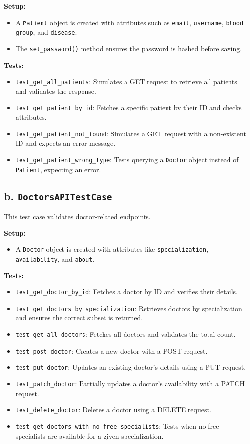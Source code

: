 \documentclass[12pt]{article}
\begin{document}
\textbf{Setup:}
\begin{itemize}
    \item A \texttt{Patient} object is created with attributes such as \texttt{email}, \texttt{username}, \texttt{blood group}, and \texttt{disease}.
    \item The \texttt{set\_password()} method ensures the password is hashed before saving.
\end{itemize}

\textbf{Tests:}
\begin{itemize}
    \item \texttt{test\_get\_all\_patients}: Simulates a GET request to retrieve all patients and validates the response.
    \item \texttt{test\_get\_patient\_by\_id}: Fetches a specific patient by their ID and checks attributes.
    \item \texttt{test\_get\_patient\_not\_found}: Simulates a GET request with a non-existent ID and expects an error message.
    \item \texttt{test\_get\_patient\_wrong\_type}: Tests querying a \texttt{Doctor} object instead of \texttt{Patient}, expecting an error.
\end{itemize}

\subsection*{b. \texttt{DoctorsAPITestCase}}
This test case validates doctor-related endpoints.

\textbf{Setup:}
\begin{itemize}
    \item A \texttt{Doctor} object is created with attributes like \texttt{specialization}, \texttt{availability}, and \texttt{about}.
\end{itemize}

\textbf{Tests:}
\begin{itemize}
    \item \texttt{test\_get\_doctor\_by\_id}: Fetches a doctor by ID and verifies their details.
    \item \texttt{test\_get\_doctors\_by\_specialization}: Retrieves doctors by specialization and ensures the correct subset is returned.
    \item \texttt{test\_get\_all\_doctors}: Fetches all doctors and validates the total count.
    \item \texttt{test\_post\_doctor}: Creates a new doctor with a POST request.
    \item \texttt{test\_put\_doctor}: Updates an existing doctor's details using a PUT request.
    \item \texttt{test\_patch\_doctor}: Partially updates a doctor's availability with a PATCH request.
    \item \texttt{test\_delete\_doctor}: Deletes a doctor using a DELETE request.
    \item \texttt{test\_get\_doctors\_with\_no\_free\_specialists}: Tests when no free specialists are available for a given specialization.
\end{itemize}
\end{document}
